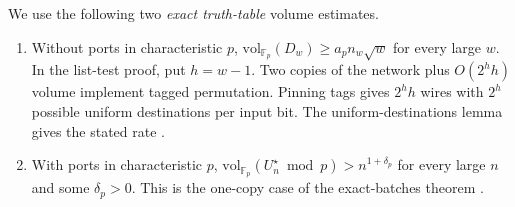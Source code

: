 \documentclass[11pt]{article}
\theoremstyle{definition}
\theoremstyle{remark}
\newcommand{\vol}{\mathrm{vol}}
\newcommand{\F}{\mathbb{F}}
\begin{document}
We use the following two \emph{exact truth-table} volume estimates.
\begin{enumerate}
\item Without ports in characteristic $p$,
$\vol_{\F_p}(D_w)\ge a_p n_w\sqrt w$ for every large $w$.
In the list-test proof, put $h=w-1$. Two copies of the network plus
$O(2^hh)$ volume implement tagged permutation. Pinning tags gives
$2^hh$ wires with $2^h$ possible uniform destinations per input bit.
The uniform-destinations lemma gives the stated rate
\cite[Section~4]{OAI}.
\item With ports in characteristic $p$,
$\vol_{\F_p}(U_n^\star\bmod p)> n^{1+\delta_p}$ for every large
$n$ and some $\delta_p>0$. This is the one-copy case of the
exact-batches theorem \cite[Theorem~12.1]{HC}.
\end{enumerate}
\end{document}
